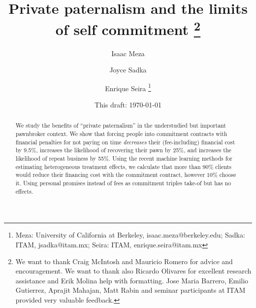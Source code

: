 \documentclass[11pt]{article}
\begin{document}
\title{Private paternalism and the limits of self commitment  \thanks{We want to thank Craig McIntosh and Mauricio Romero for advice and encouragement. We want to thank also Ricardo Olivares for excellent research assistance and Erik Molina help with formatting. Jose Maria Barrero, Emilio Gutierrez, Aprajit Mahajan, Matt Rabin and seminar participants at ITAM provided very valuable feedback.}}
\author{Isaac Meza \and Joyce Sadka \and Enrique Seira   \thanks{Meza: University of California at Berkeley, isaac.meza@berkeley.edu; Sadka: ITAM, jsadka@itam.mx;  
Seira: ITAM, enrique.seira@itam.mx} }
\date{This draft:  \today \\[2 cm]}



\maketitle
\begin{abstract}


We study the benefits of ``private paternalism'' in the understudied but important pawnbroker context. We show that forcing people into commitment contracts with financial penalties for not paying on time \textit{decreases} their (fee-including) financial cost by 9.5\%, increases the likelihood of recovering their pawn by 25\%, and increases the likelihood of repeat business by 55\%. Using the recent machine learning methods for estimating heterogeneous treatment effects, we calculate that more than 90\% clients would reduce their financing cost with the commitment contract, however 10\% choose it. Using personal promises instead of fees as commitment triples take-of but has no effects.


\end{abstract}
\end{document}
